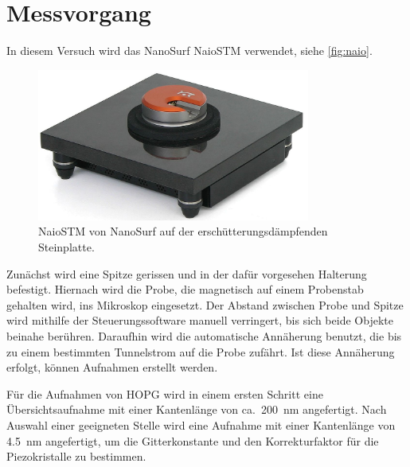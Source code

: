 \section{Messvorgang}
 
In diesem Versuch wird das NanoSurf NaioSTM verwendet, siehe \autoref{fig:naio}.
\begin{figure}
  \centering
  \includegraphics[width=0.8\textwidth]{./images/naiostm-zoom.jpg}
  \caption{%
    NaioSTM von NanoSurf auf der erschütterungsdämpfenden Steinplatte.~\cite{naio}
  }\label{fig:naio}
\end{figure}

Zunächst wird eine Spitze gerissen und in der dafür vorgesehen Halterung befestigt.
Hiernach wird die Probe, die magnetisch auf einem Probenstab gehalten wird, ins Mikroskop eingesetzt.
Der Abstand zwischen Probe und Spitze wird mithilfe der Steuerungssoftware manuell verringert, bis sich beide Objekte beinahe berühren.
Daraufhin wird die automatische Annäherung benutzt, die bis zu einem bestimmten Tunnelstrom auf die Probe zufährt.
Ist diese Annäherung erfolgt, können Aufnahmen erstellt werden.

Für die Aufnahmen von HOPG wird in einem ersten Schritt eine Übersichtsaufnahme mit einer Kantenlänge von ca.\ \SI{200}{\nano\meter} angefertigt.
Nach Auswahl einer geeigneten Stelle wird eine Aufnahme mit einer Kantenlänge von \SI{4.5}{\nano\meter} angefertigt, um die Gitterkonstante und den Korrekturfaktor für die Piezokristalle zu bestimmen.
